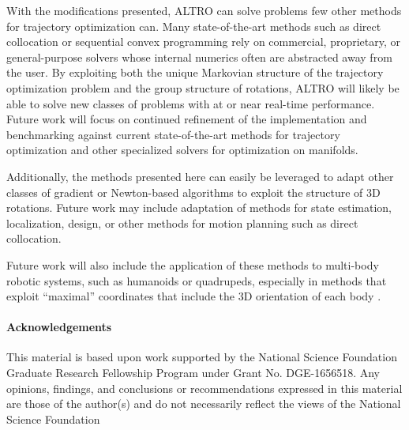 \documentclass[letterpaper, 10 pt, conference]{ieeeconf}  %
\begin{document}
    With the modifications presented, ALTRO can solve problems few other methods for 
    trajectory optimization can. Many state-of-the-art methods such as direct 
    collocation or sequential convex programming rely on commercial, proprietary, or 
    general-purpose solvers whose internal numerics often are abstracted away from the user. 
    By exploiting both the unique Markovian structure of the trajectory optimization problem
    and the group structure of rotations, ALTRO will likely be able to solve new classes of 
    problems with at or near real-time performance. Future work will focus on continued 
    refinement of the implementation and benchmarking against current state-of-the-art 
    methods for trajectory optimization and other specialized solvers for optimization on
    manifolds.

    Additionally, the methods presented here can easily be leveraged to adapt other classes
    of gradient or Newton-based algorithms to exploit the structure of 3D rotations. Future
    work may include adaptation of methods for state estimation, localization, design, or 
    other methods for motion planning such as direct collocation. 
    
    Future work will also include the application of these methods to multi-body robotic
    systems, such as humanoids or quadrupeds, especially in methods that exploit 
    ``maximal'' coordinates that include the 3D orientation of each body \cite{brudigam2020linear}. 

\paragraph*{Acknowledgements}
This material is based upon work supported by the National Science Foundation Graduate
Research Fellowship Program under Grant No. DGE-1656518. Any opinions, findings, and
conclusions or recommendations expressed in this material are those of the author(s) and
do not necessarily reflect the views of the National Science Foundation


\printbibliography
\end{document}
